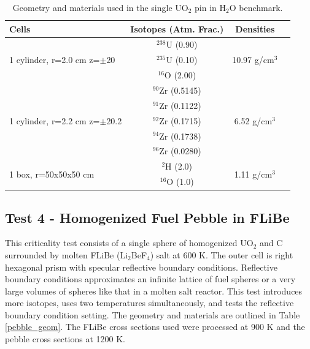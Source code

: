 \documentclass[preprint,12pt]{elsarticle}
\begin{document}
\begin{table}[h]
\centering
\caption{Geometry and materials used in the single UO$_2$ pin in H$_2$O benchmark.}
\label{uo2_pincell_geom}
\begin{tabular}{| l | c | c | c |}
\hline
Cells & Isotopes (Atm. Frac.)& Densities \\
\hline
\multirow{3}{*}{1 cylinder, r=2.0 cm z=$\pm$20 }  &   $^{238}$U   (0.90) &    \multirow{3}{*}{10.97 g/cm$^3$} \\
                                       &   $^{235}$U   (0.10)& \\
                                       &   $^{16}$O    (2.00)& \\
\hline
\multirow{5}{*}{1 cylinder, r=2.2 cm z=$\pm$20.2}  &   $^{90}$Zr   (0.5145) &    \multirow{5}{*}{6.52 g/cm$^3$} \\
                                       &   $^{91}$Zr   (0.1122)& \\
                                       &   $^{92}$Zr   (0.1715)& \\
                                       &   $^{94}$Zr   (0.1738)& \\
                                       &   $^{96}$Zr   (0.0280)& \\
\hline
\multirow{2}{*}{1 box, r=50x50x50 cm }  &    $^{2}$H   (2.0) &    \multirow{2}{*}{1.11 g/cm$^3$} \\
                                  &   $^{16}$O   (1.0) & \\
\hline
\end{tabular}
\end{table}

\subsection{Test 4 - Homogenized Fuel Pebble in FLiBe}

This criticality test consists of a single sphere of homogenized UO$_2$ and C surrounded by molten FLiBe (Li$_2$BeF$_4$) salt at 600 K.  The outer cell is right hexagonal prism with specular reflective boundary conditions.  Reflective boundary conditions approximates an infinite lattice of fuel spheres or a very large volumes of spheres like that in a molten salt reactor. This test introduces more isotopes, uses two temperatures simultaneously, and tests the reflective boundary condition setting.  The geometry and materials are outlined in Table \ref{pebble_geom}. The FLiBe cross sections used were processed at 900 K and the pebble cross sections at 1200 K.
\end{document}
